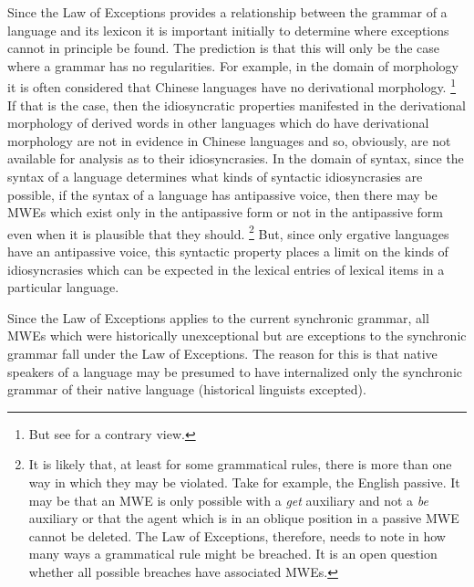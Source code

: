 \documentclass[output=paper]{langsci/langscibook}
\begin{document}
Since the Law of Exceptions  provides a relationship between the grammar of 
a language and its lexicon it is important initially to determine where 
exceptions cannot in principle be found. The prediction is that this will 
only be the case where a grammar has no regularities. For example, in the 
domain of morphology it is often considered that Chinese languages  have no 
derivational morphology.%
\footnote{   But see \citet{Starosta1997} for a contrary view.} If that is 
the case, then the idiosyncratic properties manifested in the derivational 
morphology of derived words in other languages which do have derivational 
morphology are not in evidence in Chinese languages and so, obviously, are 
not available for analysis as to their idiosyncrasies. 
In the domain of 
syntax, since the syntax of a language determines what kinds of syntactic 
idiosyncrasies are possible, if the syntax of a language has  antipassive 
voice, then there may be MWEs which exist only in the antipassive form or 
not in the antipassive form even when it is plausible that they 
should.%
\footnote{   It is likely that, at least for some grammatical rules, there 
is more than one way in which they may be violated. Take for example, the 
English  passive. It may be that an MWE is only possible with a 
\textit{get} auxiliary and not a \textit{be} auxiliary or that the agent 
which is in an oblique position in a passive MWE cannot be deleted. The 
Law of Exceptions, therefore, needs to note in how many ways a grammatical 
rule might be breached. It is an open question whether all possible 
breaches have associated MWEs.} But, since only ergative languages have an 
antipassive voice, this syntactic property places a limit on the kinds of 
idiosyncrasies which can be expected in the lexical entries of lexical 
items in a particular language. 

Since the Law of Exceptions applies to the current synchronic grammar, all 
MWEs which were historically unexceptional but are exceptions to the 
synchronic grammar fall under the Law of Exceptions. The reason for this 
is that native speakers of a language may be presumed to have internalized 
only the synchronic grammar of their native language (historical linguists 
excepted). 
\end{document}
